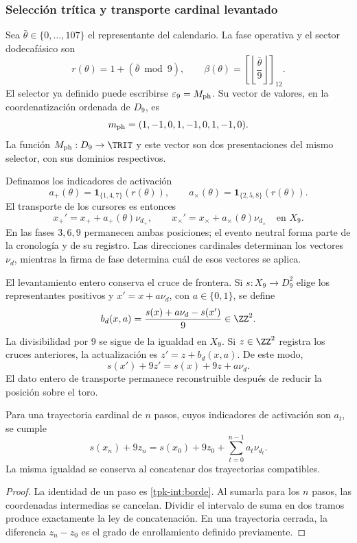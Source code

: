 \subsubsection{Selección trítica y transporte cardinal levantado}
\label{tpk-int:seleccion}

Sea \(\bar\theta\in\{0,\ldots,107\}\) el representante del calendario.
La fase operativa y el sector dodecafásico son
\begin{equation}
 r(\theta)=1+(\bar\theta\bmod9),\qquad
 \beta(\theta)=\left[\left\lfloor\frac{\bar\theta}{9}\right\rfloor\right]_{12}.
 \label{tpk-int:fase}
\end{equation}
El selector ya definido puede escribirse \(\varepsilon_9=M_{\rm ph}\).
Su vector de valores, en la coordenatización ordenada de \(D_9\), es
\[
 m_{\rm ph}=(1,-1,0,1,-1,0,1,-1,0).
\]
La función \(M_{\rm ph}:D_9\to\TRIT\) y este vector son dos
presentaciones del mismo selector, con sus dominios respectivos.

Definamos los indicadores de activación
\[
 a_+(\theta)=\mathbf1_{\{1,4,7\}}(r(\theta)),\qquad
 a_\times(\theta)=\mathbf1_{\{2,5,8\}}(r(\theta)).
\]
El transporte de los cursores es entonces
\begin{equation}
 x_+'=x_++a_+(\theta)\nu_{d_+},\qquad
 x_\times'=x_\times+a_\times(\theta)\nu_{d_\times}
 \quad\text{en }X_9.
 \label{tpk-int:cursores}
\end{equation}
En las fases \(3,6,9\) permanecen ambas posiciones; el evento neutral
forma parte de la cronología y de su registro. Las direcciones cardinales
determinan los vectores \(\nu_d\), mientras la firma de fase determina
cuál de esos vectores se aplica.

El levantamiento entero conserva el cruce de frontera. Si
\(s:X_9\to D_9^2\) elige los representantes positivos y
\(x'=x+a\nu_d\), con \(a\in\{0,1\}\), se define
\begin{equation}
 b_d(x,a)=\frac{s(x)+a\nu_d-s(x')}{9}\in\ZZ^2.
 \label{tpk-int:borde}
\end{equation}
La divisibilidad por \(9\) se sigue de la igualdad en \(X_9\).
Si \(z\in\ZZ^2\) registra los cruces anteriores, la actualización es
\(z'=z+b_d(x,a)\). De este modo,
\[
 s(x')+9z'=s(x)+9z+a\nu_d.
\]
El dato entero de transporte permanece reconstruible después de reducir
la posición sobre el toro.

\begin{proposition}
\label{tpk-int:prop-desplazamiento}
Para una trayectoria cardinal de \(n\) pasos, cuyos indicadores de
activación son \(a_t\), se cumple
\[
 s(x_n)+9z_n=s(x_0)+9z_0+
 \sum_{t=0}^{n-1}a_t\nu_{d_t}.
\]
La misma igualdad se conserva al concatenar dos trayectorias compatibles.
\end{proposition}
\begin{proof}
La identidad de un paso es \eqref{tpk-int:borde}. Al sumarla para los
\(n\) pasos, las coordenadas intermedias se cancelan. Dividir el intervalo
de suma en dos tramos produce exactamente la ley de concatenación. En una
trayectoria cerrada, la diferencia \(z_n-z_0\) es el grado de
enrollamiento definido previamente.
\end{proof}

